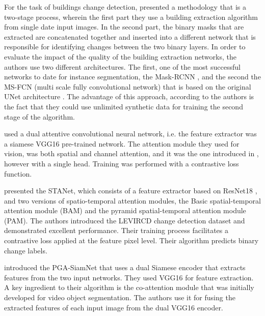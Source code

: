 \documentclass[times, 5p]{elsarticle}
\begin{document}
 
 
For the task of buildings change detection,  
\cite{rs11111343} presented a methodology that is a two-stage process, wherein the first part they use a building extraction algorithm from single date input images. In the second part, the binary masks that are extracted are concatenated together and inserted into a different network that is responsible for identifying changes between the two binary layers. In order to evaluate the impact of the quality of the building extraction networks, the authors use two different architectures. The first, one of the most successful networks to date for instance segmentation, the Mask-RCNN \citep{DBLP:journals/corr/HeGDG17}, and the second the MS-FCN (multi scale fully convolutional network) that is based on the original UNet architecture \citep{DBLP:journals/corr/RonnebergerFB15}. The advantage of this approach, according to the authors is the fact that they could use unlimited synthetic data for training the second stage of the algorithm.  

\cite{chen2020dasnet} used a dual attentive convolutional neural network, i.e. the feature extractor was a siamese VGG16 pre-trained network. The attention module they used for vision, was both spatial and channel attention, and it was the one introduced in \cite{DBLP:journals/corr/VaswaniSPUJGKP17}, however with a single head.  Training was performed with a contrastive loss function. 

\cite{rs12101662} presented the STANet, which consists of a feature extractor based on ResNet18 \citep{DBLP:journals/corr/HeZRS15}, and two versions of spatio-temporal attention modules, the Basic spatial-temporal attention module (BAM) and the pyramid spatial-temporal attention module (PAM). The authors introduced the LEVIRCD change detection dataset and demonstrated excellent performance. Their training process facilitates a contrastive loss applied at the feature pixel level. Their algorithm predicts binary change labels.  

\cite{rs12030484} introduced the PGA-SiamNet that uses a dual Siamese encoder that extracts features from the two input networks. They used VGG16 for feature extraction. A key ingredient to their algorithm is the co-attention module \citep{Lu_2019_CVPR} that was initially developed for video object segmentation. The authors use it for fusing  the extracted features of each input image from the dual VGG16 encoder.  
\end{document}
